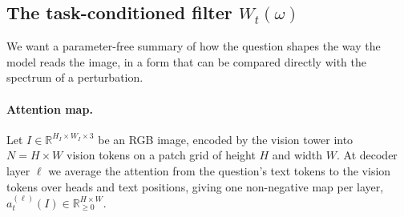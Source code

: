 

\subsection{The task-conditioned filter $W_t(\omega)$}
\label{sec:filter}

We want a parameter-free summary of how the question shapes the way the
model reads the image, in a form that can be compared directly with the
spectrum of a perturbation.

\paragraph{Attention map.}
Let $I\in\mathbb{R}^{H_I\times W_I\times 3}$ be an RGB image, encoded by
the vision tower into $N=H\times W$ vision tokens on a patch grid of
height $H$ and width $W$. At decoder layer $\ell$ we average the
attention from the question's text tokens to the vision tokens over
heads and text positions, giving one non-negative map per layer,
$a^{(\ell)}_t(I)\in\mathbb{R}_{\ge 0}^{H\times W}$.

